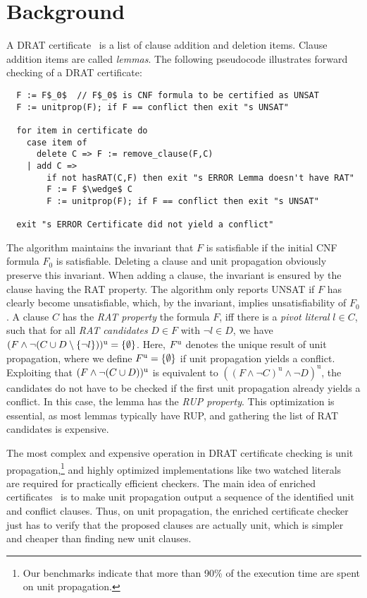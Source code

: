 \documentclass{llncs}
\begin{document}
\section{Background}
A DRAT certificate~\cite{WHH14} is a list of clause addition and deletion items. Clause addition items are called \emph{lemmas}.
The following pseudocode illustrates forward checking of a DRAT certificate:
\begin{lstlisting}
  F := F$_0$  // F$_0$ is CNF formula to be certified as UNSAT
  F := unitprop(F); if F == conflict then exit "s UNSAT"
  
  for item in certificate do
    case item of
      delete C => F := remove_clause(F,C)
    | add C =>
        if not hasRAT(C,F) then exit "s ERROR Lemma doesn't have RAT"
        F := F $\wedge$ C
        F := unitprop(F); if F == conflict then exit "s UNSAT"
  
  exit "s ERROR Certificate did not yield a conflict"
\end{lstlisting}
The algorithm maintains the invariant that $F$ is satisfiable if the initial CNF formula $F_0$ is satisfiable.
Deleting a clause and unit propagation obviously preserve this invariant. When adding a clause, the invariant 
is ensured by the clause having the RAT property. The algorithm only reports UNSAT if $F$ has clearly become unsatisfiable, 
which, by the invariant, implies unsatisfiability of $F_0$.
A clause $C$ has the \emph{RAT property} \wrt the formula $F$, iff there is
a \emph{pivot literal} $l\in C$, such that for all \emph{RAT candidates} $D\in F$ with $\neg l \in D$, we have $(F \wedge \neg(C \cup D\setminus\{\neg l\}))^{\textrm u} = \{\emptyset\}$.
Here, $F^{\textrm u}$ denotes the unique result of unit propagation, where we define $F^{\textrm u} = \{\emptyset\}$ if unit propagation yields a conflict.
Exploiting that $(F\wedge\neg(C\cup D))^\textrm{u}$ is equivalent to $((F \wedge \neg C)^\textrm{u} \wedge \neg D)^\textrm{u}$, the candidates do not have to 
be checked if the first unit propagation already yields a conflict. In this case, the lemma has the \emph{RUP property}.
This optimization is essential, as most lemmas typically have RUP, and gathering the list of RAT candidates is expensive.

The most complex and expensive operation in DRAT certificate checking is unit propagation,\footnote{Our benchmarks indicate that more than 90\% of the execution time are spent on unit propagation.}
and highly optimized implementations like two watched literals~\cite{MMZZ01} are required for practically efficient checkers.
The main idea of enriched certificates~\cite{CMS17} is to make unit propagation output a sequence of the identified unit and conflict clauses. 
Thus, on unit propagation, the enriched certificate checker just has to verify that the proposed clauses are actually unit, which is simpler and cheaper than finding new unit clauses.
\end{document}
